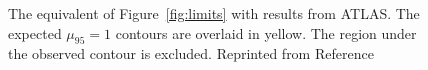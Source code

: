 \begin{figure}[htbp]
  \centering
  \caption{
    The equivalent of Figure~\ref{fig:limits} with results from ATLAS.
    The expected $\mu_{95} = 1$ contours are overlaid in yellow. 
    The region under the observed contour is excluded.
    Reprinted from Reference~\cite{ATLAS2017} 
  }
  \label{fig:limits_atlas}
\end{figure}

